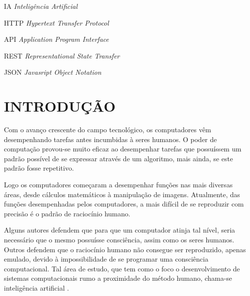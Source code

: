 \documentclass[12pt, openright, oneside, a4paper, brazil]{abntex2}
\begin{document}
\newpage %
\listofquadros* %
\cleardoublepage

\listoffigures*
\cleardoublepage

\begin{siglas}

	\item[IA]{\textit{Inteligência Artificial}}
	\item[HTTP]{\textit{Hypertext Transfer Protocol}}
	\item[API]{\textit{Application Program Interface}}
	\item[REST]{\textit{Representational State Transfer}}
	\item[JSON]{\textit{Javasript Object Notation}}

\end{siglas}

\tableofcontents*
\textual

\chapter{INTRODUÇÃO}

Com o avanço crescente do campo tecnológico, os computadores vêm desempenhando tarefas antes incumbidas à seres humanos. O poder de computação provou-se muito eficaz ao desempenhar tarefas que possuíssem um padrão possível de se expressar através de um algoritmo, mais ainda, se este padrão fosse repetitivo.

Logo os computadores começaram a desempenhar funções nas mais diversas áreas, desde cálculos matemáticos à manipulação de imagens. Atualmente, das funções desempenhadas pelos computadores, a mais difícil de se reproduzir com precisão é o padrão de raciocínio humano.

Alguns autores defendem que para que um computador atinja tal nível, seria necessário que o mesmo possuísse consciência, assim como os seres humanos. Outros defendem que o raciocínio humano não consegue ser reproduzido, apenas emulado, devido à impossibilidade de se programar uma consciência computacional. Tal área de estudo, que tem como o foco o desenvolvimento de sistemas computacionais rumo a proximidade do método humano, chama-se inteligência artificial \cite{russell2004inteligencia, coppin2015inteligencia}.
\end{document}
